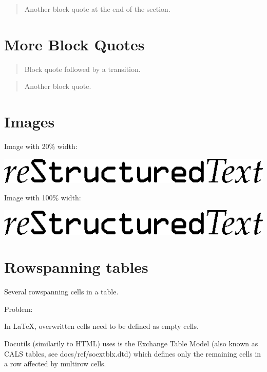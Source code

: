 \documentclass[a4paper]{article}
\providecommand*{\DUtransition}{%
  \hspace*{\fill}\hrulefill\hspace*{\fill}
  \vskip 0.5\baselineskip
}
\begin{document}
\begin{quote}
Another block quote at the end of the section.
\end{quote}


\section{More Block Quotes%
  \label{more-block-quotes}%
}

\begin{quote}
Block quote followed by a transition.
\end{quote}

\DUtransition

\begin{quote}
Another block quote.
\end{quote}


\section{Images%
  \label{images}%
}

Image with 20\% width:

\includegraphics[width=0.200\linewidth]{../../../docs/user/rst/images/title.png}

Image with 100\% width:

\includegraphics[width=1.000\linewidth]{../../../docs/user/rst/images/title.png}


\section{Rowspanning tables%
  \label{rowspanning-tables}%
}

Several rowspanning cells in a table.

Problem:

In LaTeX, \textquotedbl{}overwritten\textquotedbl{} cells need to be defined as empty cells.

Docutils (similarily to HTML) uses is the \textquotedbl{}Exchange Table Model\textquotedbl{} (also known
as CALS tables, see docs/ref/soextblx.dtd) which defines only the remaining
cells in a row \textquotedbl{}affected\textquotedbl{} by multirow cells.
\end{document}
